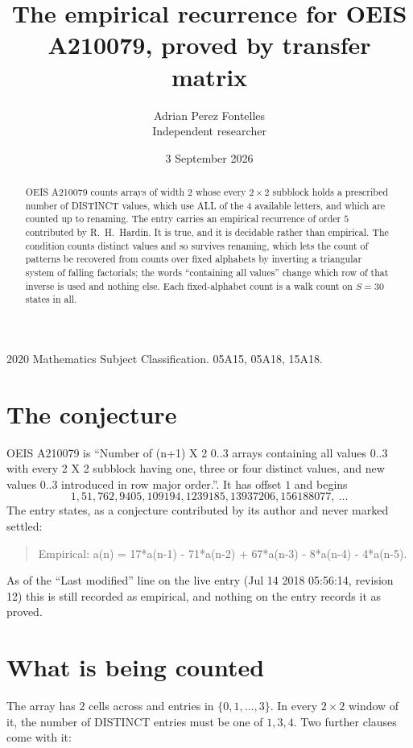 \documentclass[11pt,a4paper]{article}
\title{The empirical recurrence for OEIS A210079, proved by transfer matrix}
\author{Adrian Perez Fontelles\\ \small Independent researcher}
\date{3 September 2026}
\theoremstyle{plain}
\theoremstyle{definition}
\begin{document}
\maketitle

\begin{abstract}
OEIS A210079 counts arrays of width $2$ whose every $2\times2$ subblock holds a
prescribed number of DISTINCT values, which use ALL of the $4$ available letters, and which
are counted up to renaming. The entry carries an empirical recurrence of order $5$
contributed by R.~H.~Hardin. It is true, and it is decidable rather than empirical. The
condition counts distinct values and so survives renaming, which lets the count of patterns be
recovered from counts over fixed alphabets by inverting a triangular system of falling
factorials; the words ``containing all values'' change which row of that inverse is used and
nothing else. Each fixed-alphabet count is a walk count on $S=30$ states in all.
\end{abstract}

\noindent\small 2020 Mathematics Subject Classification. 05A15, 05A18, 15A18.\normalsize

\section{The conjecture}

OEIS A210079 is ``Number of (n+1) X 2 0..3 arrays containing all values 0..3 with every 2 X 2 subblock having one, three or four distinct values, and new values 0..3 introduced in row major order.''. It has offset $1$ and begins
\[
1, 51, 762, 9405, 109194, 1239185, 13937206, 156188077,\ \dots
\]
The entry states, as a conjecture contributed by its author and never marked settled:
\begin{quote}
Empirical: a(n) = 17*a(n-1) - 71*a(n-2) + 67*a(n-3) - 8*a(n-4) - 4*a(n-5).
\end{quote}
As of the ``Last modified'' line on the live entry (Jul 14 2018 05:56:14, revision 12) this is still
recorded as empirical, and nothing on the entry records it as proved.

\section{What is being counted}

The array has $2$ cells across and entries in $\{0,1,\dots,3\}$. In every
$2\times2$ window of it, the number of DISTINCT entries must be one of $1, 3, 4$. Two
further clauses come with it:
\end{document}
